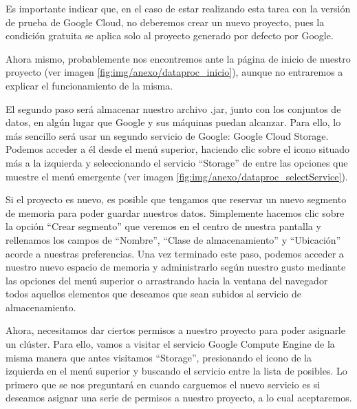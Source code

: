 
Es importante indicar que, en el caso de estar realizando esta tarea con la versión de prueba de Google Cloud, no deberemos crear un nuevo proyecto, pues la condición gratuita se aplica solo al proyecto generado por defecto por Google.

Ahora mismo, probablemente nos encontremos ante la página de inicio de nuestro proyecto (ver imagen \ref{fig:img/anexo/dataproc_inicio}), aunque no entraremos a explicar el funcionamiento de la misma.


El segundo paso será almacenar nuestro archivo .jar, junto con los conjuntos de datos, en algún lugar que Google y sus máquinas puedan alcanzar. Para ello, lo más sencillo será usar un segundo servicio de Google: Google Cloud Storage. Podemos acceder a él desde el menú superior, haciendo clic sobre el icono situado más a la izquierda y seleccionando el servicio ``Storage'' de entre las opciones que muestre el menú emergente (ver imagen \ref{fig:img/anexo/dataproc_selectService}).


Si el proyecto es nuevo, es posible que tengamos que reservar un nuevo segmento de memoria para poder guardar nuestros datos. Simplemente hacemos clic sobre la opción ``Crear segmento'' que veremos en el centro de nuestra pantalla y rellenamos los campos de ``Nombre'', ``Clase de almacenamiento'' y ``Ubicación'' acorde a nuestras preferencias. Una vez terminado este paso, podemos acceder a nuestro nuevo espacio de memoria y administrarlo según nuestro gusto mediante las opciones del menú superior o arrastrando hacia la ventana del navegador todos aquellos elementos que deseamos que sean subidos al servicio de almacenamiento.

Ahora, necesitamos dar ciertos permisos a nuestro proyecto para poder asignarle un clúster. Para ello, vamos a visitar el servicio Google Compute Engine de la misma manera que antes visitamos ``Storage'', presionando el icono de la izquierda en el menú superior y buscando el servicio entre la lista de posibles. Lo primero que se nos preguntará en cuando carguemos el nuevo servicio es si deseamos asignar una serie de permisos a nuestro proyecto, a lo cual aceptaremos.

